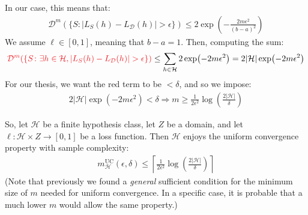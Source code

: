 \documentclass[../template.tex]{subfiles}
\begin{document}
\begin{itemize}
    In our case, this means that:
    \begin{align*}
        \mathcal{D}^m(\{S\colon |L_S(h) - L_{\mathcal{D}}(h)|> \epsilon\}) \leq 2 \exp\left(-\frac{2m \epsilon^2}{(b-a)^2} \right)
    \end{align*}
    We assume $\ell \in [0,1]$, meaning that $b-a=1$. Then, computing the sum:
    \begin{align*}
        \textcolor{Red}{\mathcal{D}^m(\{S \colon \exists h \in \mathcal{H}, |L_S(h) - L_{\mathcal{D}}(h)| > \epsilon \})} \leq \sum_{h \in \mathcal{H}} 2 \exp(-2 m \epsilon^2) = 2 |\mathcal{H}| \exp(-2 m \epsilon^2)
    \end{align*}
    For our thesis, we want the red term to be $< \delta$, and so we impose:
    \begin{align*}
        2 |\mathcal{H}| \exp(-2 m \epsilon^2) < \delta \Rightarrow m \geq \frac{1}{2 \epsilon^2} \log\left(\frac{2|\mathcal{H}|}{\delta} \right) 
    \end{align*}
    
    So, let $\mathcal{H}$ be a finite hypothesis class, let $Z$ be a domain, and let $\ell \colon \mathcal{H}\times Z \to [0,1]$ be a loss function. Then $\mathcal{H}$ enjoys the uniform convergence property with sample complexity:
    \begin{align*}
        m_{\mathcal{H}}^{\mathrm{UC}}(\epsilon, \delta) \leq \left \lceil \frac{1}{2 \epsilon^2} \log(\frac{2|\mathcal{H}|}{\delta} )\right \rceil
    \end{align*}
    (Note that previously we found a \textit{general} sufficient condition for the minimum size of $m$ needed for uniform convergence. In a specific case, it is probable that a much lower $m$ would allow the same property.)

\end{itemize}
\end{document}
